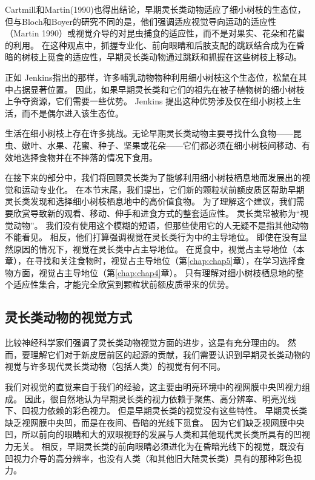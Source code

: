 Cartmill\cite{cartmill1974rethinking}和Martin(1990)也得出结论，早期灵长类动物适应了细小树枝的生态位，但与Bloch和Boyer的研究不同的是，他们强调适应视觉导向运动的适应性（Martin 1990）或视觉介导的对昆虫捕食的适应性\cite{cartmill2017arboreal,bloch2002grasping}，而不是对果实、花朵和花蜜的利用\cite{sussman1991primate,bloch2002grasping}。
在这种观点中，抓握专业化、前向眼睛和后肢支配的跳跃结合成为在昏暗的树枝上觅食的适应性，早期灵长类动物通过跳跃和抓握在这些树枝上移动。


正如 Jenkins\cite{jenkins1974tree}指出的那样，许多哺乳动物物种利用细小树枝这个生态位，松鼠在其中占据显著位置。
因此，如果早期灵长类和它们的祖先在被子植物树的细小树枝上争夺资源，它们需要一些优势。
Jenkins 提出这种优势涉及仅在细小树枝上生活，而不是偶尔进入该生态位。


生活在细小树枝上存在许多挑战。无论早期灵长类动物主要寻找什么食物——昆虫、嫩叶、水果、花蜜、种子、坚果或花朵——它们都必须在细小树枝间移动、有效地选择食物并在不摔落的情况下食用。


在接下来的部分中，我们将回顾灵长类为了能够利用细小树枝栖息地而发展出的视觉和运动专业化。
在本节末尾，我们提出，它们新的颗粒状前额皮质区帮助早期灵长类发现和选择细小树枝栖息地中的高价值食物。
为了理解这个建议，我们需要欣赏导致新的观看、移动、伸手和进食方式的整套适应性。
灵长类常被称为“视觉动物”。
我们没有使用这个模糊的短语，但那些使用它的人无疑不是指其他动物不能看见。
相反，他们打算强调视觉在灵长类行为中的主导地位。
即使在没有显然原因的情况下，视觉在灵长类中占主导地位。
在觅食中，视觉占主导地位（本章），在寻找和关注食物时，视觉占主导地位（第\ref{chap:chap5}章），在学习选择食物方面，视觉占主导地位（第\ref{chap:chap4}章）。
只有理解对细小树枝栖息地的整个适应性集合，才能完全欣赏到颗粒状前额皮质带来的优势。



\subsection{灵长类动物的视觉方式}

比较神经科学家们强调了灵长类动物视觉方面的进步，这是有充分理由的。
然而，要理解它们对于新皮层前区的起源的贡献，我们需要认识到早期灵长类动物的视觉与许多现代灵长类动物（包括人类）的视觉有何不同。


我们对视觉的直觉来自于我们的经验，这主要由明亮环境中的视网膜中央凹视力组成。
因此，很自然地认为早期灵长类的视力依赖于聚焦、高分辨率、明亮光线下、凹视力依赖的彩色视力。
但是早期灵长类的视觉没有这些特性。
早期灵长类缺乏视网膜中央凹，而是在夜间、昏暗的光线下觅食。
因为它们缺乏视网膜中央凹，所以前向的眼睛和大的双眼视野的发展与人类和其他现代灵长类所具有的凹视力无关。
相反，早期灵长类的前向眼睛必须进化为在昏暗光线下的视觉，既没有凹视力介导的高分辨率，也没有人类（和其他旧大陆灵长类）具有的那种彩色视力。



